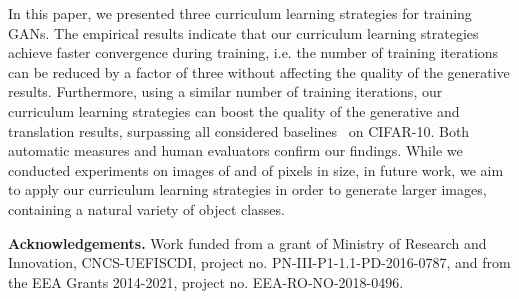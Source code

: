 \documentclass[10pt,twocolumn,letterpaper]{article}
\begin{document}
In this paper, we presented three curriculum learning strategies for training GANs. The empirical results indicate that our curriculum learning strategies achieve faster convergence during training, i.e. the number of training iterations can be reduced by a factor of three without affecting the quality of the generative results. Furthermore, using a similar number of training iterations, our curriculum learning strategies can boost the quality of the generative and translation results, surpassing all considered baselines~\cite{Avraham-CVPR-2019,Doan-AAAI-2019,Gulrajani-NIPS-2017,Hoshen-CVPR-2019,Miyato-ICLR-2018,Radford-ICLR-2016,Zhu-ICCV-2017} on CIFAR-10. Both automatic measures and human evaluators confirm our findings. While we conducted experiments on images of  and  of pixels in size, in future work, we aim to apply our curriculum learning strategies in order to generate larger images, containing a natural variety of object classes.

\noindent
{\bf Acknowledgements.}
Work funded from a grant of Ministry of Research and Innovation, CNCS-UEFISCDI, project no. PN-III-P1-1.1-PD-2016-0787, and from the EEA Grants 2014-2021, project no. EEA-RO-NO-2018-0496.

{\small


}
\end{document}
